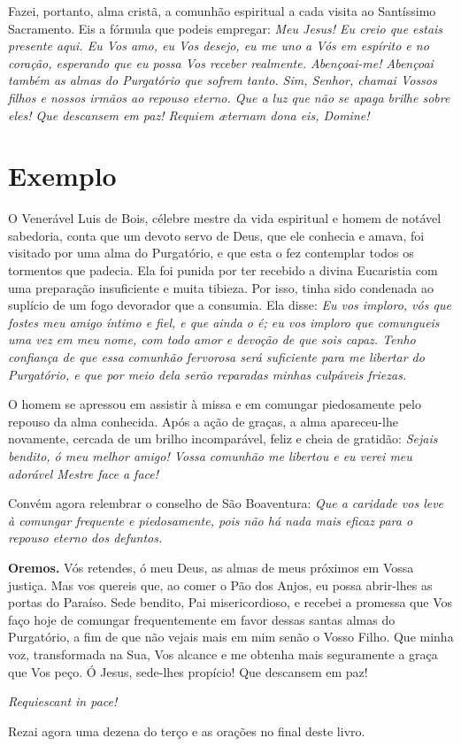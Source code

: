 Fazei, portanto, alma cristã, a comunhão espiritual a cada visita ao Santíssimo Sacramento. Eis a fórmula que podeis empregar: \textit{Meu Jesus! Eu creio que estais presente aqui. Eu Vos amo, eu Vos desejo, eu me uno a Vós em espírito e no coração, esperando que eu possa Vos receber realmente. Abençoai-me! Abençoai também as almas do Purgatório que sofrem tanto. Sim, Senhor, chamai Vossos filhos e nossos irmãos ao repouso eterno. Que a luz que não se apaga brilhe sobre eles! Que descansem em paz! Requiem æternam dona eis, Domine!}


\section*{Exemplo }

O Venerável Luis de Bois, célebre mestre da vida espiritual e homem de notável sabedoria, conta que um devoto servo de Deus, que ele conhecia e amava, foi visitado por uma alma do Purgatório, e que esta o fez contemplar todos os tormentos que padecia. Ela foi punida por ter recebido a divina Eucaristia com uma preparação insuficiente e muita tibieza. Por isso, tinha sido condenada ao suplício de um fogo devorador que a consumia. Ela disse: \textit{Eu vos imploro, vós que fostes meu amigo íntimo e fiel, e que ainda o é; eu vos imploro que comungueis uma vez em meu nome, com todo amor e devoção de que sois capaz. Tenho confiança de que essa comunhão fervorosa será suficiente para me libertar do Purgatório, e que por meio dela serão reparadas minhas culpáveis friezas.}

O homem se apressou em assistir à missa e em comungar piedosamente pelo repouso da alma conhecida. Após a ação de graças, a alma apareceu-lhe novamente, cercada de um brilho incomparável, feliz e cheia de gratidão: \textit{Sejais bendito, ó meu melhor amigo! Vossa comunhão me libertou e eu verei meu adorável Mestre face a face!} 

Convém agora relembrar o conselho de São Boaventura: \textit{Que a caridade vos leve à comungar frequente e piedosamente, pois não há nada mais eficaz para o repouso eterno dos defuntos.}


\vspace{\baselineskip}\noindent \textbf{Oremos.} Vós retendes, ó meu Deus, as almas de meus próximos em Vossa justiça. Mas vos quereis que, ao comer o Pão dos Anjos, eu possa abrir-lhes as portas do Paraíso. Sede bendito, Pai misericordioso, e recebei a promessa que Vos faço hoje de comungar frequentemente em favor dessas santas almas do Purgatório, a fim de que não vejais mais em mim senão o Vosso Filho. Que minha voz, transformada na Sua, Vos alcance e me obtenha mais seguramente a graça que Vos peço. Ó Jesus, sede-lhes propício! Que descansem em paz!



\begin{center}
\textit{Requiescant in pace!}
\end{center}

Rezai agora uma dezena do terço e as orações no final deste livro.
